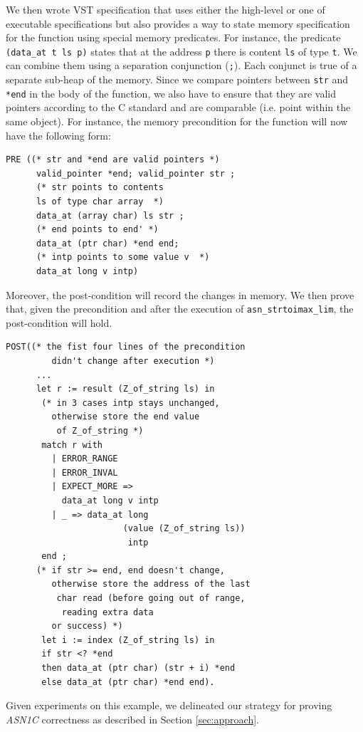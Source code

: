 \documentclass[10p,conference]{IEEEtran}
\begin{document}
 We then wrote VST specification that uses either the high-level
 or one of executable specifications but also provides a way to
 state memory specification for the function using special memory
 predicates. For instance, the predicate \texttt{(data\_at t ls p)}
 states that at the address \texttt{p} there is content \texttt{ls} of
 type \texttt{t}. We can combine them using a separation conjunction
 (\texttt{;}). Each conjunct is true of a separate sub-heap of the
 memory. Since we compare pointers between \texttt{str} and \texttt{*end} in the body of the function, we also have to ensure
 that they are valid pointers according to the C standard and are
 comparable (i.e. point within the same object). For instance, the
 memory precondition for the function will now have the following form:
\begin{lstlisting}[language=Coq]
PRE ((* str and *end are valid pointers *)
      valid_pointer *end; valid_pointer str ;
      (* str points to contents 
      ls of type char array  *)
      data_at (array char) ls str ; 
      (* end points to end' *)
      data_at (ptr char) *end end;
      (* intp points to some value v  *)
      data_at long v intp)
     \end{lstlisting}

     Moreover, the post-condition will record the changes in memory. We then
     prove that, given the precondition and after the execution of
     \texttt{asn\_strtoimax\_lim}, the post-condition will hold.
           
\begin{lstlisting}[language=Coq]
 POST((* the fist four lines of the precondition 
         didn't change after execution *)
      ... 
      let r := result (Z_of_string ls) in
       (* in 3 cases intp stays unchanged,
         otherwise store the end value
          of Z_of_string *)
       match r with 
         | ERROR_RANGE 
         | ERROR_INVAL 
         | EXPECT_MORE => 
           data_at long v intp
         | _ => data_at long 
                       (value (Z_of_string ls))
                        intp 
       end ;
      (* if str >= end, end doesn't change, 
         otherwise store the address of the last
          char read (before going out of range,
           reading extra data 
         or success) *)
       let i := index (Z_of_string ls) in
       if str <? *end
       then data_at (ptr char) (str + i) *end
       else data_at (ptr char) *end end).
\end{lstlisting}

Given experiments on this example, we delineated our strategy for proving
\emph{ASN1C} correctness as described in Section \ref{sec:approach}.
\end{document}
